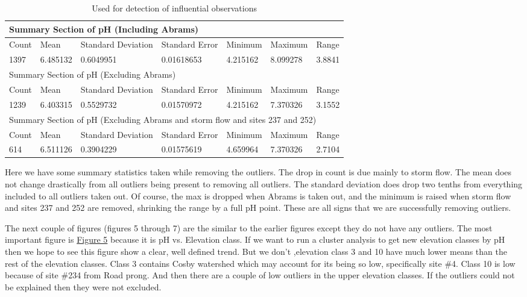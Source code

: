 \documentclass[11pt]{article} %
\begin{document}
\begin{table}[htbp]
\caption{Used for detection of influential observations}
\begin{tabular}{lllllll}
\toprule
\multicolumn{7}{l}{Summary Section of pH (Including Abrams)}  \\ 
\midrule
Count & Mean & Standard Deviation & Standard Error & Minimum & Maximum & Range \\ 
1397 & 6.485132 &0.6049951 & 0.01618653 &4.215162 & 8.099278 & 3.8841 \\ 
\midrule
\multicolumn{7}{l}{Summary Section of pH (Excluding Abrams)} \\ 
\midrule
Count & Mean & Standard Deviation & Standard Error & Minimum & Maximum & Range \\ 
1239 & 6.403315 & 0.5529732 & 0.01570972 & 4.215162 & 7.370326 & 3.1552 \\ 
\midrule
\multicolumn{7}{l}{Summary Section of pH (Excluding Abrams and storm flow and sites 237 and 252)}\\ 
\midrule
Count & Mean & Standard Deviation & Standard Error & Minimum & Maximum & Range \\ 
614 & 6.511126 & 0.3904229 & 0.01575619 & 4.659964 &7.370326 & 2.7104 \\ 
\bottomrule
\end{tabular}
\label{Data Summary}
\end{table}


Here we have some summary statistics taken while removing the outliers.  The drop in count is due mainly to storm flow.  The mean does not change drastically from all outliers being present to removing all outliers.  The standard deviation does drop two tenths from everything included to all outliers taken out.  Of course, the max is dropped when Abrams is taken out, and the minimum is raised when storm flow and sites 237 and 252 are removed, shrinking the range by a full pH point.  These are all signs that we are successfully removing outliers. 
    
The next couple of figures (figures 5 through 7) are the similar to the earlier figures except they do not have any outliers.  The most important figure is \hyperref[CAGraph8]{Figure 5} because it is pH vs. Elevation class.  If we want to run a cluster analysis to get new elevation classes by pH then we hope to see this figure show a clear, well defined trend.  But we don't ,elevation class 3 and 10 have much lower means than the rest of the elevation classes.  Class 3 contains Cosby watershed which may account for its being so low, specifically site $\#$4.  Class 10 is low because of site $\#$234 from Road prong.  And then there are a couple of low outliers in the upper elevation classes.  If the outliers could not be explained then they were not excluded.
\end{document}
